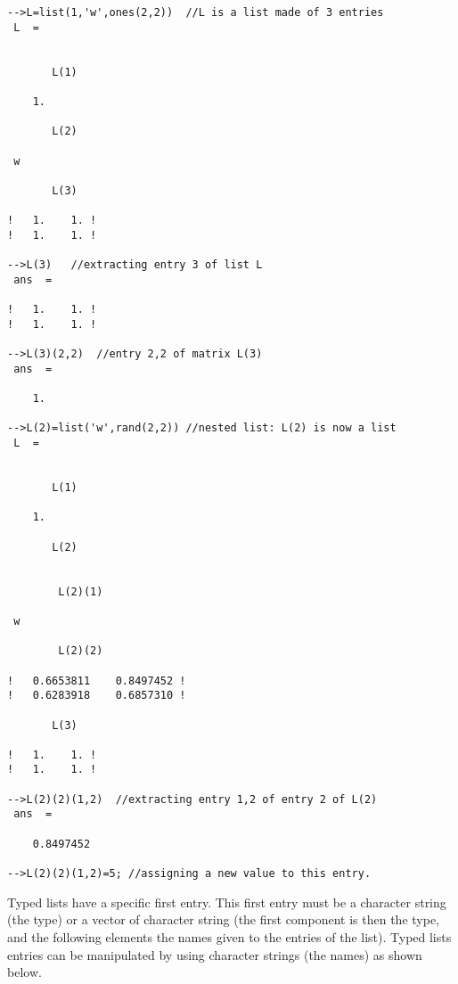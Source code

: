 \begin{verbatim}
-->L=list(1,'w',ones(2,2))  //L is a list made of 3 entries
 L  =
 
 
       L(1)
 
    1.  
 
       L(2)
 
 w   
 
       L(3)
 
!   1.    1. !
!   1.    1. !

-->L(3)   //extracting entry 3 of list L
 ans  =
 
!   1.    1. !
!   1.    1. !

-->L(3)(2,2)  //entry 2,2 of matrix L(3)
 ans  =
 
    1.  

-->L(2)=list('w',rand(2,2)) //nested list: L(2) is now a list
 L  =
 
 
       L(1)
 
    1.  
 
       L(2)
 
 
        L(2)(1)
 
 w   
 
        L(2)(2)
 
!   0.6653811    0.8497452 !
!   0.6283918    0.6857310 !
 
       L(3)
 
!   1.    1. !
!   1.    1. !

-->L(2)(2)(1,2)  //extracting entry 1,2 of entry 2 of L(2)
 ans  =
 
    0.8497452  

-->L(2)(2)(1,2)=5; //assigning a new value to this entry.

\end{verbatim}

Typed lists have a specific first entry. This first entry must be a 
character string (the type) or a vector of character string (the first
component is then the type, and the following elements the names given
to the entries of the list). Typed lists entries can be manipulated
by using character strings (the names) as shown below.

